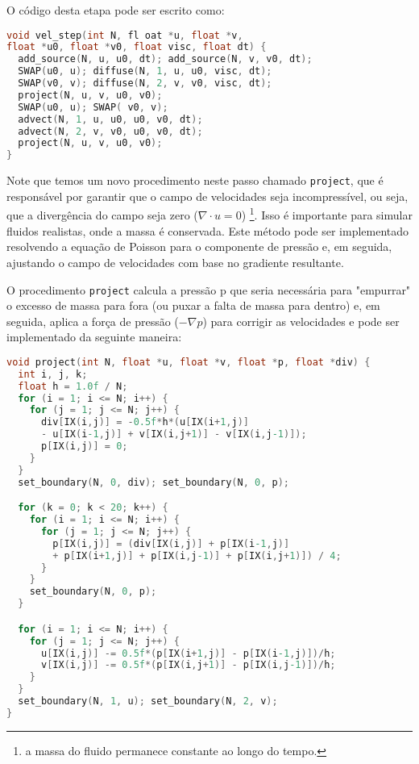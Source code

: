 O código desta etapa pode ser escrito como:

\begin{lstlisting}[language=C]
void vel_step(int N, fl oat *u, float *v, 
float *u0, float *v0, float visc, float dt) {
  add_source(N, u, u0, dt); add_source(N, v, v0, dt);
  SWAP(u0, u); diffuse(N, 1, u, u0, visc, dt);
  SWAP(v0, v); diffuse(N, 2, v, v0, visc, dt);
  project(N, u, v, u0, v0);
  SWAP(u0, u); SWAP( v0, v);
  advect(N, 1, u, u0, u0, v0, dt);
  advect(N, 2, v, v0, u0, v0, dt);
  project(N, u, v, u0, v0);
}
\end{lstlisting}

Note que temos um novo procedimento neste passo chamado \texttt{project}, que é responsável por garantir que o campo de velocidades seja incompressível, ou seja, que a divergência do campo seja zero ($\nabla \cdot u = 0$) \footnote{a massa do fluido permanece constante ao longo do tempo.}. Isso é importante para simular fluidos realistas, onde a massa é conservada. Este método pode ser implementado resolvendo a equação de Poisson para o componente de pressão e, em seguida, ajustando o campo de velocidades com base no gradiente resultante.

O procedimento \texttt{project} calcula a pressão p que seria necessária para "empurrar" o excesso de massa para fora (ou puxar a falta de massa para dentro) e, em seguida, aplica a força de pressão ($-\nabla p$) para corrigir as velocidades e pode ser implementado da seguinte maneira:

\begin{lstlisting}[language=C]
void project(int N, float *u, float *v, float *p, float *div) {
  int i, j, k;
  float h = 1.0f / N;
  for (i = 1; i <= N; i++) {
    for (j = 1; j <= N; j++) {
      div[IX(i,j)] = -0.5f*h*(u[IX(i+1,j)]
      - u[IX(i-1,j)] + v[IX(i,j+1)] - v[IX(i,j-1)]);
      p[IX(i,j)] = 0;
    }
  }
  set_boundary(N, 0, div); set_boundary(N, 0, p);

  for (k = 0; k < 20; k++) {
    for (i = 1; i <= N; i++) {
      for (j = 1; j <= N; j++) {
        p[IX(i,j)] = (div[IX(i,j)] + p[IX(i-1,j)]
        + p[IX(i+1,j)] + p[IX(i,j-1)] + p[IX(i,j+1)]) / 4;
      }
    }
    set_boundary(N, 0, p);
  }

  for (i = 1; i <= N; i++) {
    for (j = 1; j <= N; j++) {
      u[IX(i,j)] -= 0.5f*(p[IX(i+1,j)] - p[IX(i-1,j)])/h;
      v[IX(i,j)] -= 0.5f*(p[IX(i,j+1)] - p[IX(i,j-1)])/h;
    }
  }
  set_boundary(N, 1, u); set_boundary(N, 2, v);
}
\end{lstlisting}

